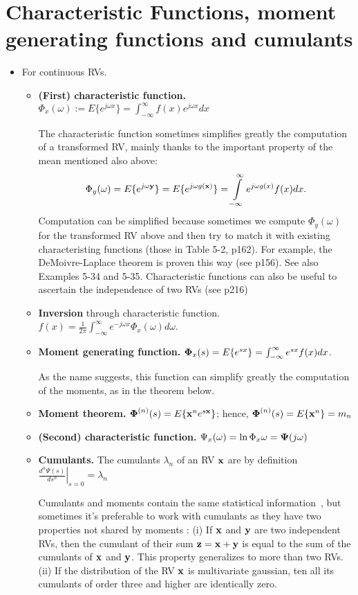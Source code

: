 \documentclass[a4paper, oneside]{book}
\begin{document}
\section{Characteristic Functions, moment generating functions and cumulants}
\begin{itemize}
\item For continuous RVs.
	\begin{itemize}
	\item \textbf{(First) characteristic function.} $\Phi_x(\omega) := E\{e^{j\omega x}\} = \int_{-\infty}^{\infty} f(x) e^{j \omega x}dx$
	
	The characteristic function sometimes simplifies greatly the computation of a transformed RV, mainly thanks to the important property of the mean mentioned also above: %
	 $$\Phi_y(\omega) = E\{e^{j\omega \mathbf y}\} = E\{e^{j\omega g(\mathbf x)}\} = \int\limits_{-\infty}^{\infty} e^{j\omega g(x)} f(x) dx.$$
	Computation can be simplified because sometimes we compute $\Phi_y(\omega)$ for the transformed RV above and then try to match it with existing characteristing functions (\eg those in Table 5-2, p162). For example, the DeMoivre-Laplace theorem is proven this way (see p156). See also Examples 5-34 and 5-35.
	Characteristic functions can also be useful to ascertain the independence of two RVs (see p216)
	\item \textbf{Inversion} through characteristic function. $f(x) = \frac{1}{2\pi} \int_{-\infty}^\infty e^{-j\omega x} \Phi_x(\omega) d\omega$.
	\item \textbf{Moment generating function.} $\boldsymbol \Phi_x(s) = E\{e^{sx}\} = \int_{-\infty}^{\infty} e^{s x} f(x)dx$.
	
	As the name suggests, this function can simplify greatly the computation of the moments, as in the theorem below.
	\item \textbf{Moment theorem.} $\boldsymbol \Phi^{(n)}(s) = E\{\mathbf x^n e^{s \mathbf x}\}$; hence, $\boldsymbol \Phi^{(n)}(s)=E\{\mathbf x^n\} = m_n$
	\item \textbf{(Second) characteristic function.} $\Psi_x(\omega) = \ln \Phi_x{\omega} = \boldsymbol \Psi (j\omega)$
	\item \textbf{Cumulants.} The cumulants $\lambda_n$ of an RV $\mathbf x$ are by definition $\left.\frac{d^n\Psi(s)}{d s^n}\right|_{s=0}=\lambda_n$
	
	Cumulants and moments contain the same statistical information~\cite{hyvarinen04}, but sometimes it's preferable to work with cumulants as they have two properties not shared by moments \cite{hyvarinen04}: (i) If $\mathbf {x}$ and $\mathbf y$ are two independent RVs, then the cumulant of their sum $\mathbf z = \mathbf{x+y}$ is equal to the sum of the cumulants of $\mathbf x$ and $\mathbf y$. This property generalizes to more than two RVs. (ii) If the distribution of the RV $\mathbf x$ is multivariate gaussian, ten all its cumulants of order three and higher are identically zero. 
	\end{itemize}	
	

\end{itemize}
\end{document}
